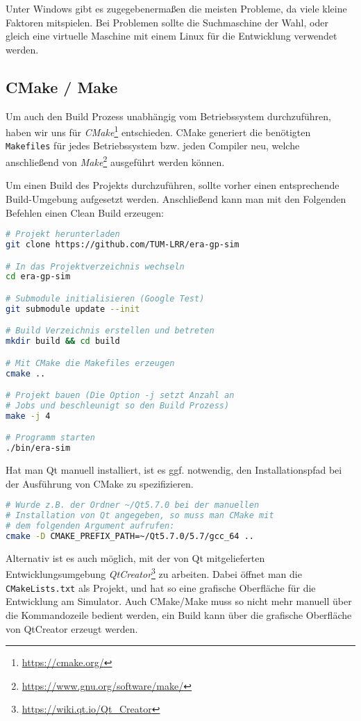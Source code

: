 Unter Windows gibt es zugegebenermaßen die meisten Probleme, da viele kleine
Faktoren mitspielen. Bei Problemen sollte die Suchmaschine der Wahl, oder gleich
eine virtuelle Maschine mit einem Linux für die Entwicklung verwendet werden.

\subsection{CMake / Make}
\label{dev-report-cmake-build}
Um auch den Build Prozess unabhängig vom Betriebssystem durchzuführen, haben wir uns für
\emph{CMake}\footnote{\url{https://cmake.org/}} entschieden. CMake generiert die benötigten
\texttt{Makefiles} für jedes Betriebssystem bzw. jeden Compiler neu, welche anschließend
von \emph{Make}\footnote{\url{https://www.gnu.org/software/make/}} ausgeführt werden können.

Um einen Build des Projekts durchzuführen, sollte vorher einen entsprechende Build-Umgebung
aufgesetzt werden. Anschließend kann man mit den Folgenden Befehlen einen Clean Build erzeugen:

\begin{lstlisting}[language=bash, keywords={}]
# Projekt herunterladen
git clone https://github.com/TUM-LRR/era-gp-sim

# In das Projektverzeichnis wechseln
cd era-gp-sim

# Submodule initialisieren (Google Test)
git submodule update --init

# Build Verzeichnis erstellen und betreten
mkdir build && cd build

# Mit CMake die Makefiles erzeugen
cmake ..

# Projekt bauen (Die Option -j setzt Anzahl an
# Jobs und beschleunigt so den Build Prozess)
make -j 4

# Programm starten
./bin/era-sim
\end{lstlisting}

Hat man Qt manuell installiert, ist es ggf. notwendig, den Installationspfad bei der
Ausführung von CMake zu spezifizieren.

\begin{lstlisting}[language=bash, keywords={}]
# Wurde z.B. der Ordner ~/Qt5.7.0 bei der manuellen
# Installation von Qt angegeben, so muss man CMake mit
# dem folgenden Argument aufrufen:
cmake -D CMAKE_PREFIX_PATH=~/Qt5.7.0/5.7/gcc_64 ..
\end{lstlisting}

Alternativ ist es auch möglich, mit der von Qt mitgelieferten Entwicklungsumgebung
\emph{QtCreator}\footnote{\url{https://wiki.qt.io/Qt_Creator}} zu arbeiten.
Dabei öffnet man die \texttt{CMakeLists.txt} als Projekt, und hat so eine grafische
Oberfläche für die Entwicklung am Simulator. Auch CMake/Make muss so nicht mehr
manuell über die Kommandozeile bedient werden, ein Build kann über die grafische
Oberfläche von QtCreator erzeugt werden.

